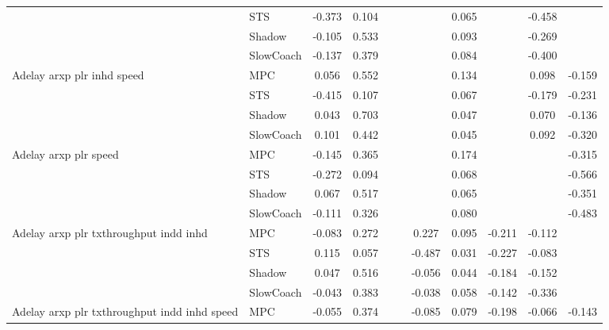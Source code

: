 \begin{tabular}{|l|l|*{9}{c|}}
                              & STS &   -0.373 &     0.104 &        &     &     &  0.065 &      &  -0.458 &       \\
                              & Shadow &   -0.105 &     0.533 &        &     &     &  0.093 &      &  -0.269 &       \\
                              & SlowCoach &   -0.137 &     0.379 &        &     &     &  0.084 &      &  -0.400 &       \\
\midrule
Adelay arxp plr inhd speed    & MPC &    0.056 &     0.552 &        &     &     &  0.134 &      &   0.098 &   -0.159 \\
                              & STS &   -0.415 &     0.107 &        &     &     &  0.067 &      &  -0.179 &   -0.231 \\
                              & Shadow &    0.043 &     0.703 &        &     &     &  0.047 &      &   0.070 &   -0.136 \\
                              & SlowCoach &    0.101 &     0.442 &        &     &     &  0.045 &      &   0.092 &   -0.320 \\
\midrule
Adelay arxp plr speed    & MPC &   -0.145 &     0.365 &        &     &     &  0.174 &      &      &   -0.315 \\
                              & STS &   -0.272 &     0.094 &        &     &     &  0.068 &      &      &   -0.566 \\
                              & Shadow &    0.067 &     0.517 &        &     &     &  0.065 &      &      &   -0.351 \\
                              & SlowCoach &   -0.111 &     0.326 &        &     &     &  0.080 &      &      &   -0.483 \\
\midrule
Adelay arxp plr txthroughput indd inhd    & MPC &   -0.083 &     0.272 &        &     &  0.227 &  0.095 &  -0.211 &  -0.112 &       \\
                              & STS &    0.115 &     0.057 &        &     & -0.487 &  0.031 &  -0.227 &  -0.083 &       \\
                              & Shadow &    0.047 &     0.516 &        &     & -0.056 &  0.044 &  -0.184 &  -0.152 &       \\
                              & SlowCoach &   -0.043 &     0.383 &        &     & -0.038 &  0.058 &  -0.142 &  -0.336 &       \\
\midrule
Adelay arxp plr txthroughput indd inhd speed    & MPC &   -0.055 &     0.374 &        &     & -0.085 &  0.079 &  -0.198 &  -0.066 &   -0.143 \\

\end{tabular}
